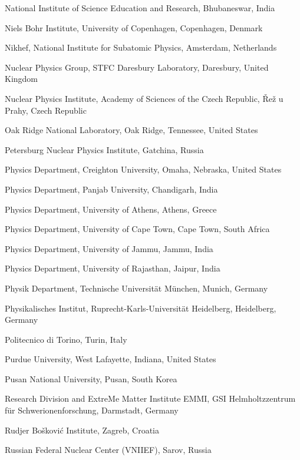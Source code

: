 \begin{flushleft}
\begin{Authlist}
\item {}National Institute of Science Education and Research, Bhubaneswar, India
\item {}Niels Bohr Institute, University of Copenhagen, Copenhagen, Denmark
\item {}Nikhef, National Institute for Subatomic Physics, Amsterdam, Netherlands
\item {}Nuclear Physics Group, STFC Daresbury Laboratory, Daresbury, United Kingdom
\item {}Nuclear Physics Institute, Academy of Sciences of the Czech Republic, \v{R}e\v{z} u Prahy, Czech Republic
\item {}Oak Ridge National Laboratory, Oak Ridge, Tennessee, United States
\item {}Petersburg Nuclear Physics Institute, Gatchina, Russia
\item {}Physics Department, Creighton University, Omaha, Nebraska, United States
\item {}Physics Department, Panjab University, Chandigarh, India
\item {}Physics Department, University of Athens, Athens, Greece
\item {}Physics Department, University of Cape Town, Cape Town, South Africa
\item {}Physics Department, University of Jammu, Jammu, India
\item {}Physics Department, University of Rajasthan, Jaipur, India
\item {}Physik Department, Technische Universit\"{a}t M\"{u}nchen, Munich, Germany
\item {}Physikalisches Institut, Ruprecht-Karls-Universit\"{a}t Heidelberg, Heidelberg, Germany
\item {}Politecnico di Torino, Turin, Italy
\item {}Purdue University, West Lafayette, Indiana, United States
\item {}Pusan National University, Pusan, South Korea
\item {}Research Division and ExtreMe Matter Institute EMMI, GSI Helmholtzzentrum f\"ur Schwerionenforschung, Darmstadt, Germany
\item {}Rudjer Bo\v{s}kovi\'{c} Institute, Zagreb, Croatia
\item {}Russian Federal Nuclear Center (VNIIEF), Sarov, Russia

\end{Authlist}
\end{flushleft}

